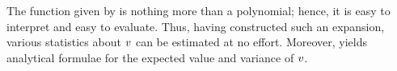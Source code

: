 The function given by  is nothing more than a polynomial; hence, it is easy to interpret and easy to evaluate.
Thus, having constructed such an expansion, various statistics about $v$ can be estimated at no effort.
Moreover,  yields analytical formulae for the expected value and variance of $v$.
